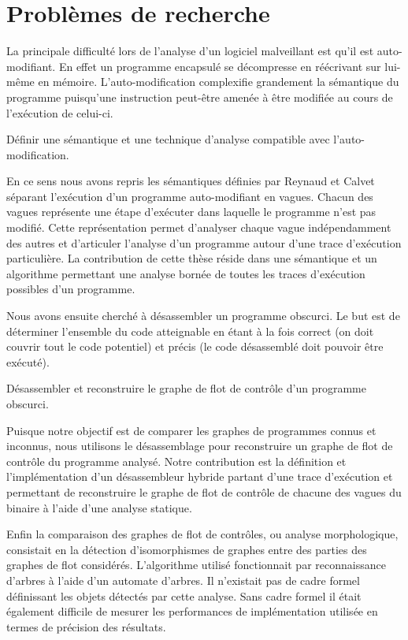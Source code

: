 \section{Problèmes de recherche}
La principale difficulté lors de l'analyse d'un logiciel malveillant est qu'il est auto-modifiant. En effet un programme encapsulé se décompresse en réécrivant sur lui-même en mémoire. L'auto-modification complexifie grandement la sémantique du programme puisqu'une instruction peut-être amenée à être modifiée au cours de l'exécution de celui-ci.

\begin{pb}
 Définir une sémantique et une technique d'analyse compatible avec l'auto-modification.
\end{pb}

En ce sens nous avons repris les sémantiques définies par Reynaud et Calvet  séparant l'exécution d'un programme auto-modifiant en vagues. Chacun des vagues représente une étape d'exécuter dans laquelle le programme n'est pas modifié. Cette représentation permet d'analyser chaque vague indépendamment des autres et d'articuler l'analyse d'un programme autour d'une trace d'exécution particulière.
La contribution de cette thèse réside dans une sémantique et un algorithme permettant une analyse bornée de toutes les traces d'exécution possibles d'un programme.

Nous avons ensuite cherché à désassembler un programme obscurci. Le but est de déterminer l'ensemble du code atteignable en étant à la fois correct (on doit couvrir tout le code potentiel) et précis (le code désassemblé doit pouvoir être exécuté). 

\begin{pb}
 Désassembler et reconstruire le graphe de flot de contrôle d'un programme obscurci.
\end{pb}

Puisque notre objectif est de comparer les graphes de programmes connus et inconnus, nous utilisons le désassemblage pour reconstruire un graphe de flot de contrôle du programme analysé.
Notre contribution est la définition et l'implémentation d'un désassembleur hybride partant d'une trace d'exécution et permettant de reconstruire le graphe de flot de contrôle de chacune des vagues du binaire à l'aide d'une analyse statique.

Enfin la comparaison des graphes de flot de contrôles, ou analyse morphologique, consistait en la détection d'isomorphismes de graphes entre des parties des graphes de flot considérés. L'algorithme utilisé fonctionnait par reconnaissance d'arbres à l'aide d'un automate d'arbres. Il n'existait pas de cadre formel définissant les objets détectés par cette analyse. Sans cadre formel il était également difficile de mesurer les performances de implémentation utilisée en termes de précision des résultats.

